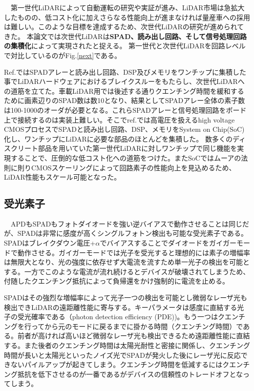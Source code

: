 \documentclass[twocolumn, 11pt, a4j]{article}
\begin{document}
　第一世代LiDARによって自動運転の研究や実証が進み、LiDAR市場は急拡大したものの、低コスト化に加えさらなる性能向上が進まなければ量産車への採用は難しい。このような目標を達成するため、次世代LiDARの研究が進められてきた。
本論文では次世代LiDARは\textbf{SPAD、読み出し回路、そして信号処理回路の集積化}によって実現されたと捉える。
第一世代と次世代LiDARを回路レベルで対比しているのがFig.\ref{next}である。

Ref.\cite{niclass2012100}ではSPADアレーと読み出し回路、DSP及びメモリをワンチップに集積した事でLiDARハードウェアにおけるブレイクスルーをもたらし、次世代LiDARへの道筋を立てた。車載LiDAR用では後述する通りクエンチング時間を緩和するために画素辺りのSPAD数は数10となり、結果としてSPADアレー全体の素子数は100-1000のオーダが必要となる。これらSPADアレーと信号処理回路をボード上で接続するのは実装上難しい。そこでref.\cite{niclass2012100}では高電圧を扱えるhigh voltage CMOSプロセスでSPADと読み出し回路、DSP、メモリをSystem on Chip(SoC)化し、ワンチップにLiDARに必要な部品のほとんどを集積した。
数多くのディスクリート部品を用いていた第一世代LiDARに対しワンチップで同じ機能を実現することで、圧倒的な低コスト化への道筋をつけた。またSoCではムーアの法則に則りCMOSスケーリングによって回路素子の性能向上を見込めるため、LiDAR性能もスケール可能となった。

\subsection{受光素子}
　APDもSPADもフォトダイオードを強い逆バイアスで動作させることは同じだが、SPADは非常に感度が高くシングルフォトン検出も可能な受光素子である\cite{niclass2005design}。SPADはブレイクダウン電圧+$\alpha$でバイアスすることでダイオードをガイガーモードで動作させる。ガイガーモードでは光子を受光すると理想的には素子の増幅率は無限大となり、光の強度に依存せず大電流を流すため単一光子の検出を可能とする。一方でこのような電流が流れ続けるとデバイスが破壊されてしまうため、付随したクエンチング抵抗によって負帰還をかけ強制的に電流を止める。

SPADはその強烈な増幅率によって光子一つの検出を可能とし微弱なレーザ光も検出できLiDARの遠距離性能に寄与する。キーパラメータは感度に直結する光子の受光確率である（photon detection efficiency (PDE))。もう一つはクエンチングを行ってから元のモードに戻るまでに掛かる時間（クエンチング時間）である。前者が高ければ高いほど微弱なレーザ光も検出できるため遠距離性能に直結する。また後者のクエンチング時間は太陽光耐性と密接に関係し、クエンチング時間が長いと太陽光といったノイズ光でSPADが発火した後にレーザ光に反応できないパイルアップが起きてしまう。クエンチング時間を低減するにはクエンチング抵抗を低下させるのが一番であるがデバイスの信頼性のトレードオフとなってしまう。%
\end{document}
